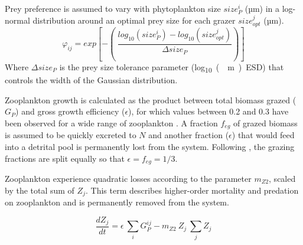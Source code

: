 \documentclass[gmd, manuscript]{copernicus}
\begin{document}
Prey preference is assumed to vary with phytoplankton size $size_{P}^i$ (\unit{µm}) in a log-normal distribution around an optimal prey size for each grazer $size_{opt}^j$ (\unit{µm}).
\begin{equation}
    \varphi_{ij} = exp \left[ -\left( \ \frac{ log_{10}(size_P^i) - log_{10}(size_{opt}^j) }{ \Delta size_{P} } \right) \right]
\end{equation}
Where $\Delta size_{P}$ is the prey size tolerance parameter (\unit{log_{10}(\mu m) ESD}) that controls the width of the Gaussian distribution.

Zooplankton growth is calculated as the product between total biomass grazed ($G_P$) and gross growth efficiency ($\epsilon$), for which values between 0.2 and 0.3 have been observed for a wide range of zooplankton \citep{Straile1997GrossGroup}. A fraction $f_{eg}$ of grazed biomass is assumed to be quickly excreted to $N$ and another fraction ($\epsilon$) that would feed into a detrital pool is permanently lost from the system. Following \citet{Banas2011b}, the grazing fractions are split equally so that $\epsilon = f_{eg} = 1/3$.

Zooplankton experience quadratic losses according to the parameter $m_{Z2}$, scaled by the total sum of $Z_j$. This term describes higher-order mortality and predation on zooplankton and is permanently removed from the system.

\begin{equation}
    \label{Eq:BanasZoo}
    \frac{d Z_j}{d t} =
    \epsilon \ \sum_{i} G_P^{ij} %
    - m_{Z2} \ Z_j \ \sum_{j} Z_j  %
\end{equation}
\end{document}
